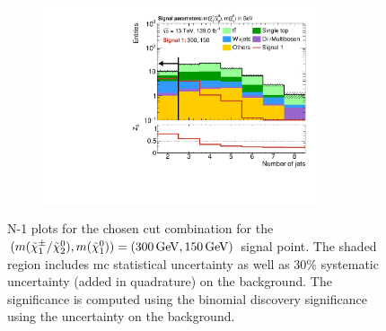 \begin{figure}
\begin{subfigure}[b]{0.5\linewidth}
	\end{subfigure}\hfill
	\begin{subfigure}[b]{0.5\linewidth}
		\centering\includegraphics[width=0.9\textwidth]{N-1_cut_scan/n1_300_150/nJet30}
	\end{subfigure}

	\caption[N-1 plots for the chosen cut combination for the (300, 150) signal point]{N-1 plots for the chosen cut combination for the $(m(\charg/\neutr), m(\lsp)) = (\SI{300}{\GeV}, \SI{150}{\GeV})$ signal point. The shaded region includes \gls{mc} statistical uncertainty as well as 30\% systematic uncertainty (added in quadrature) on the background. The significance is computed using the binomial discovery significance using the uncertainty on the background.}
	\label{fig:results_n1_300_150}
\end{figure}


